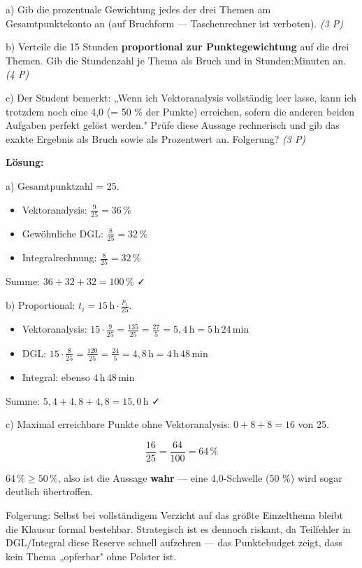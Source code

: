 \documentclass[11pt, a4paper]{article}
\begin{document}
a) Gib die prozentuale Gewichtung jedes der drei Themen am Gesamtpunktekonto an (auf Bruchform — Taschenrechner ist verboten). \textit{(3 P)}


b) Verteile die 15 Stunden \textbf{proportional zur Punktegewichtung} auf die drei Themen. Gib die Stundenzahl je Thema als Bruch und in Stunden:Minuten an. \textit{(4 P)}


c) Der Student bemerkt: „Wenn ich Vektoranalysis vollständig leer lasse, kann ich trotzdem noch eine 4,0 (= 50 \% der Punkte) erreichen, sofern die anderen beiden Aufgaben perfekt gelöst werden." Prüfe diese Aussage rechnerisch und gib das exakte Ergebnis als Bruch sowie als Prozentwert an. Folgerung? \textit{(3 P)}


\textbf{Lösung:}


a) Gesamtpunktzahl = 25.

\begin{itemize}
  \item Vektoranalysis: $\frac{9}{25} = 36\,\%$
  \item Gewöhnliche DGL: $\frac{8}{25} = 32\,\%$
  \item Integralrechnung: $\frac{8}{25} = 32\,\%$
\end{itemize}

Summe: $36 + 32 + 32 = 100\,\%$ ✓


b) Proportional: $t_i = 15\,\text{h} \cdot \frac{p_i}{25}$.


\begin{itemize}
  \item Vektoranalysis: $15 \cdot \frac{9}{25} = \frac{135}{25} = \frac{27}{5} = 5{,}4\,\text{h} = 5\,\text{h}\,24\,\text{min}$
  \item DGL: $15 \cdot \frac{8}{25} = \frac{120}{25} = \frac{24}{5} = 4{,}8\,\text{h} = 4\,\text{h}\,48\,\text{min}$
  \item Integral: ebenso $4\,\text{h}\,48\,\text{min}$
\end{itemize}

Summe: $5{,}4 + 4{,}8 + 4{,}8 = 15{,}0\,\text{h}$ ✓


c) Maximal erreichbare Punkte ohne Vektoranalysis: $0 + 8 + 8 = 16$ von 25.


\[
\frac{16}{25} = \frac{64}{100} = 64\,\%
\]


$64\,\% \geq 50\,\%$, also ist die Aussage \textbf{wahr} — eine 4,0-Schwelle (50 \%) wird sogar deutlich übertroffen.


Folgerung: Selbst bei vollständigem Verzicht auf das größte Einzelthema bleibt die Klausur formal bestehbar. Strategisch ist es dennoch riskant, da Teilfehler in DGL/Integral diese Reserve schnell aufzehren — das Punktebudget zeigt, dass kein Thema „opferbar" ohne Polster ist.
\end{document}
